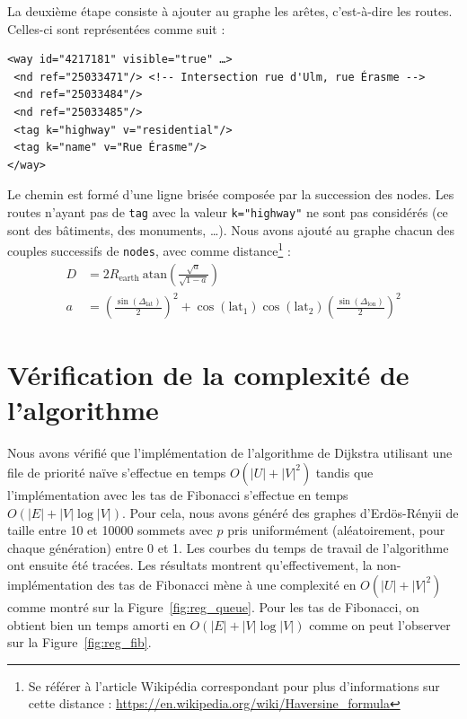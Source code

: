 \documentclass{article}
\begin{document}
La deuxième étape consiste à ajouter au graphe les arêtes,
c'est-à-dire les routes. Celles-ci sont représentées comme suit :
\begin{verbatim}
<way id="4217181" visible="true" …>
 <nd ref="25033471"/> <!-- Intersection rue d'Ulm, rue Érasme -->
 <nd ref="25033484"/>
 <nd ref="25033485"/>
 <tag k="highway" v="residential"/>
 <tag k="name" v="Rue Érasme"/>
</way>
\end{verbatim}
Le chemin est formé d'une ligne brisée composée par la succession des nodes.
Les routes n'ayant pas de \verb|tag| avec la valeur \verb|k="highway"|
ne sont pas considérés (ce sont des bâtiments, des monuments, …). Nous
avons ajouté au graphe chacun des couples successifs de \verb|nodes|, avec
comme distance\footnote{Se référer à l'article Wikipédia correspondant pour plus d'informations sur cette distance : \url{https://en.wikipedia.org/wiki/Haversine_formula}} :
\begin{align*}
  D & = 2 R_\mathrm{earth}\ \mathrm{atan} \left( \frac{\sqrt{a}}{\sqrt{1-a}} \right) \\
  a & = \left( \frac{\sin(\Delta_\mathrm{lat})}{2} \right)^2 +
      \cos(\mathrm{lat_1})\cos(\mathrm{lat_2}) \left( \frac{\sin(\Delta_\mathrm{lon})}{2} \right)^2
\end{align*}

\section{Vérification de la complexité de l'algorithme}
Nous avons vérifié que l'implémentation de l'algorithme de Dijkstra
utilisant une file de priorité naïve s'effectue en temps $O(|U| + |V|^2)$ tandis
que l'implémentation avec les tas de Fibonacci s'effectue en temps
$O(|E| + |V|\log |V|)$. Pour cela, nous avons généré des graphes
d'Erdös-Rényii de taille entre 10 et 10000 sommets avec $p$ pris uniformément (aléatoirement, pour chaque génération) entre 0 et 1. Les courbes du temps de travail de l'algorithme ont ensuite été
tracées. Les résultats montrent qu'effectivement, la
non-implémentation des tas de Fibonacci mène à une complexité en
$O(|U| + |V|^2)$ comme montré sur la Figure~\ref{fig:reg_queue}. Pour
les tas de Fibonacci, on obtient bien un temps amorti en $O(|E| +
|V|\log |V|)$ comme on peut l'observer sur la Figure~\ref{fig:reg_fib}.
\end{document}
